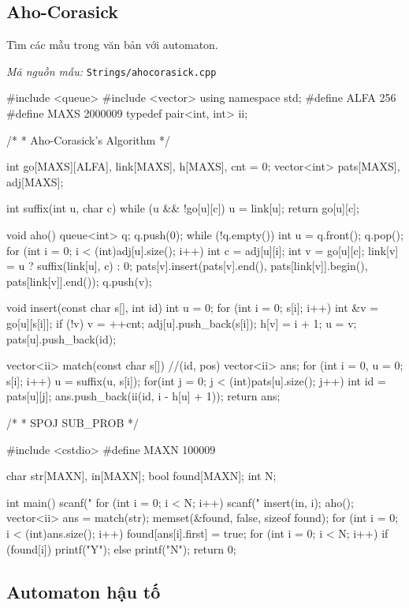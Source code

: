 \documentclass[11pt]{article}
\newcommand{\codepath}[1]{\par\noindent\textit{Mã nguồn mẫu:} \texttt{#1}\par}
\begin{document}
\subsection{Aho-Corasick}

Tìm các mẫu trong văn bản với automaton.

\codepath{Strings/ahocorasick.cpp}

\begingroup\scriptsize
\begin{vncode}
#include <queue>
#include <vector>
using namespace std;
#define ALFA 256
#define MAXS 2000009
typedef pair<int, int> ii;

/*
 * Aho-Corasick's Algorithm
 */

int go[MAXS][ALFA], link[MAXS], h[MAXS], cnt = 0;
vector<int> pats[MAXS], adj[MAXS];

int suffix(int u, char c) {
	while (u && !go[u][c]) u = link[u];
	return go[u][c];
}

void aho() {
	queue<int> q;
	q.push(0);
	while (!q.empty()) {
		int u = q.front(); q.pop();
		for (int i = 0; i < (int)adj[u].size(); i++) {
			int c = adj[u][i];
			int v = go[u][c];
			link[v] = u ? suffix(link[u], c) : 0;
			pats[v].insert(pats[v].end(), pats[link[v]].begin(), pats[link[v]].end());
			q.push(v);
		}
	}
}

void insert(const char s[], int id) {
	int u = 0;
	for (int i = 0; s[i]; i++) {
		int &v = go[u][s[i]];
		if (!v) {
			v = ++cnt;
			adj[u].push_back(s[i]);
			h[v] = i + 1;
		}
		u = v;
	}
	pats[u].push_back(id);
}

vector<ii> match(const char s[]) { //(id, pos)
	vector<ii> ans;
	for (int i = 0, u = 0; s[i]; i++) {
		u = suffix(u, s[i]);
		for(int j = 0; j < (int)pats[u].size(); j++) {
			int id = pats[u][j];
			ans.push_back(ii(id, i - h[u] + 1));
		}
	}
	return ans;
}

/*
 * SPOJ SUB_PROB
 */

#include <cstdio>
#define MAXN 100009

char str[MAXN], in[MAXN];
bool found[MAXN];
int N;

int main() {
	scanf(" %
	for (int i = 0; i < N; i++) {
		scanf(" %
		insert(in, i);
	}
	aho();
	vector<ii> ans = match(str);
	memset(&found, false, sizeof found);
	for (int i = 0; i < (int)ans.size(); i++) {
		found[ans[i].first] = true;
	}
	for (int i = 0; i < N; i++) {
		if (found[i]) printf("Y\n");
		else printf("N\n");
	}
	return 0;
}
\end{vncode}
\endgroup


\subsection{Automaton hậu tố}
\end{document}
